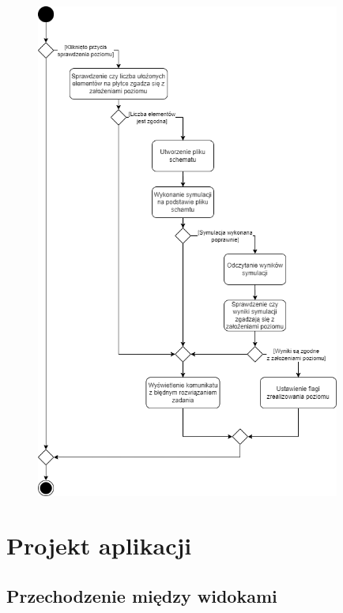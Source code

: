 \documentclass[12pt,a4paper]{article} %
\begin{document}
\begin{figure}[h]
	\centering
	\includegraphics[width=10cm]{images/diagramy_czynnosci/plan-diagram_czynnosci_sprawdzenie_poziomu.png}
	\caption{}
	\label{rys:diagram_czynnosci_sprawdzenie_poziomu}
\end{figure}


\clearpage
\section{Projekt aplikacji}
\subsection{Przechodzenie między widokami}

\end{document}

